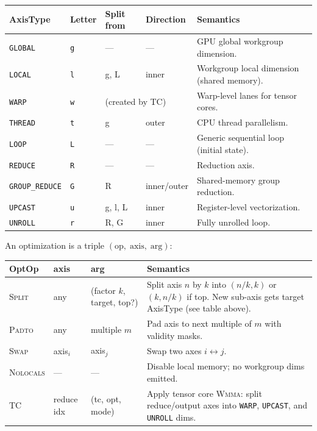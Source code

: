\documentclass[10pt,letterpaper]{article}
\newcommand{\op}[1]{\textsc{#1}}
\begin{document}
\medskip
\begin{tabular}{@{}l l l l l@{}}
\toprule
\textbf{AxisType} & \textbf{Letter} & \textbf{Split from} & \textbf{Direction} & \textbf{Semantics} \\
\midrule
{\color{axblue}\texttt{GLOBAL}} & \texttt{g} & --- & --- & GPU global workgroup dimension. \\
{\color{axcyan}\texttt{LOCAL}} & \texttt{l} & g, L & inner & Workgroup local dimension (shared memory). \\
{\color{axbrcyan}\texttt{WARP}} & \texttt{w} & \multicolumn{2}{l}{(created by \op{TC})} & Warp-level lanes for tensor cores. \\
{\color{axbrblue}\texttt{THREAD}} & \texttt{t} & g & outer & CPU thread parallelism. \\
{\color{axwhite}\texttt{LOOP}} & \texttt{L} & --- & --- & Generic sequential loop (initial state). \\
{\color{axred}\texttt{REDUCE}} & \texttt{R} & --- & --- & Reduction axis. \\
{\color{axbrred}\texttt{GROUP\_REDUCE}} & \texttt{G} & R & inner/outer & Shared-memory group reduction. \\
{\color{axyellow}\texttt{UPCAST}} & \texttt{u} & g, l, L & inner & Register-level vectorization. \\
{\color{axmagenta}\texttt{UNROLL}} & \texttt{r} & R, G & inner & Fully unrolled loop. \\
\bottomrule
\end{tabular}

\medskip
An optimization is a triple $(\mathrm{op},\;\mathrm{axis},\;\mathrm{arg})$:

\smallskip
\begin{tabular}{@{}l l l p{6.5cm}@{}}
\toprule
\textbf{OptOp} & \textbf{axis} & \textbf{arg} & \textbf{Semantics} \\
\midrule
\op{Split} & any & (factor $k$, target, top?) &
  Split axis $n$ by $k$ into $(n/k, k)$ or $(k, n/k)$ if top. New sub-axis gets target AxisType (see table above). \\
\op{Padto} & any & multiple $m$ &
  Pad axis to next multiple of $m$ with validity masks. \\[4pt]
\op{Swap} & axis$_i$ & axis$_j$ &
  Swap two axes $i \leftrightarrow j$. \\
\op{Nolocals} & --- & --- &
  Disable local memory; no workgroup dims emitted. \\
\op{TC} & reduce idx & (tc, opt, mode) &
  Apply tensor core \op{Wmma}: split reduce/output axes into \texttt{WARP}, \texttt{UPCAST}, and \texttt{UNROLL} dims. \\
\bottomrule
\end{tabular}
\end{document}
